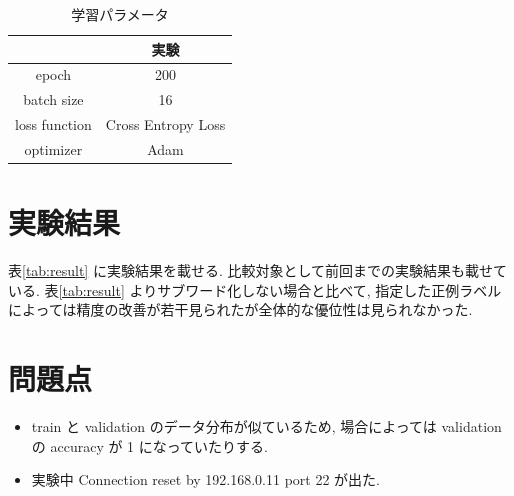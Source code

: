 \documentclass[twocolumn]{jarticle}     %
\begin{document}
\begin{table}[htb]
\caption{学習パラメータ}
\label{table:ex_para}
\centering
\begin{tabular}{|c||c|c|}
\hline
& \multicolumn{2}{|c|}{実験} \\ \hline
epoch & \multicolumn{2}{|c|}{200}  \\ \hline
batch size & \multicolumn{2}{|c|}{16} \\ \hline
loss function & \multicolumn{2}{|c|}{Cross Entropy Loss} \\ \hline
optimizer & \multicolumn{2}{|c|}{Adam} \\ \hline
\end{tabular}
\end{table}

\section{実験結果}
表\ref{tab:result} に実験結果を載せる. 比較対象として前回までの実験結果も載せている. 表\ref{tab:result} よりサブワード化しない場合と比べて, 指定した正例ラベルによっては精度の改善が若干見られたが全体的な優位性は見られなかった.

\section{問題点}
\begin{itemize}
  \item train と validation のデータ分布が似ているため, 場合によっては validation の accuracy が 1 になっていたりする.
  \item 実験中 Connection reset by 192.168.0.11 port 22 が出た.
\end{itemize}
\end{document}
